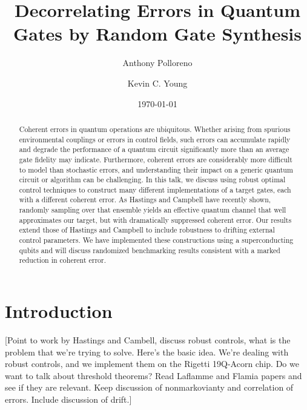 \documentclass[aps,nofootinbib,pra,notitlepage,twocolumn]{revtex4-1}
\newcommand{\note}[1]{{\color{red}[#1]}}
\begin{document}
\title{Decorrelating Errors in Quantum Gates by Random Gate Synthesis}

\author{Anthony Polloreno}

\author{Kevin C. Young}

\date{\today}

\begin{abstract}
Coherent errors in quantum operations are ubiquitous. Whether arising from spurious environmental couplings or errors in control fields, such errors can accumulate rapidly and degrade the performance of a quantum circuit significantly more than an average gate fidelity may indicate. Furthermore, coherent errors are considerably more difficult to model than stochastic errors, and understanding their impact on a generic quantum circuit or algorithm can be challenging. In this talk, we discuss using robust optimal control techniques to construct many different implementations of a target gates, each with a different coherent error. As Hastings and Campbell have recently shown, randomly sampling over that ensemble yields an effective quantum channel that well approximates our target, but with dramatically suppressed coherent error. Our results extend those of Hastings and Campbell to include robustness to drifting external control parameters. We have implemented these constructions using a superconducting qubits and will discuss randomized benchmarking results consistent with a marked reduction in coherent error.
\end{abstract}

\pacs{}

\maketitle

\section{Introduction}
\note{Point to work by Hastings and Cambell, discuss robust controls, what is the problem that we're trying to solve. Here's the basic idea. We're dealing with robust controls, and we implement them on the Rigetti 19Q-Acorn chip. Do we want to talk about threshold theorems? Read Laflamme and Flamia papers and see if they are relevant. Keep discussion of nonmarkovianty and correlation of errors. Include discussion of drift.}
\end{document}
